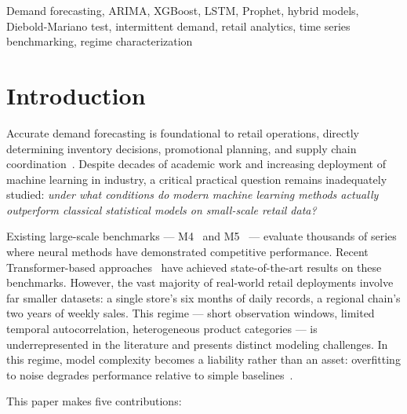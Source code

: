 \documentclass[journal]{IEEEtran}
\begin{document}
\begin{IEEEkeywords}
Demand forecasting, ARIMA, XGBoost, LSTM, Prophet, hybrid models, Diebold-Mariano test, intermittent demand, retail analytics, time series benchmarking, regime characterization
\end{IEEEkeywords}

\section{Introduction}
\label{sec:intro}

Accurate demand forecasting is foundational to retail operations, directly determining inventory decisions, promotional planning, and supply chain coordination~\cite{box2015time,chopra2019supply}. Despite decades of academic work and increasing deployment of machine learning in industry, a critical practical question remains inadequately studied: \emph{under what conditions do modern machine learning methods actually outperform classical statistical models on small-scale retail data?}

Existing large-scale benchmarks — M4~\cite{makridakis2018m4} and M5~\cite{makridakis2022m5} — evaluate thousands of series where neural methods have demonstrated competitive performance. Recent Transformer-based approaches~\cite{wen2023transformers,ekambaram2024ttm} have achieved state-of-the-art results on these benchmarks. However, the vast majority of real-world retail deployments involve far smaller datasets: a single store's six months of daily records, a regional chain's two years of weekly sales. This regime — short observation windows, limited temporal autocorrelation, heterogeneous product categories — is underrepresented in the literature and presents distinct modeling challenges. In this regime, model complexity becomes a liability rather than an asset: overfitting to noise degrades performance relative to simple baselines~\cite{makridakis2018statistical}.

This paper makes five contributions:
\end{document}
